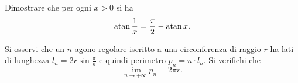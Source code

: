 \begin{exercise}
Dimostrare che per ogni $x>0$ si ha
\[
  \operatorname{atan} \frac 1 x = \frac \pi 2 - \operatorname{atan} x.
\]
\end{exercise}

\begin{exercise}
Si osservi che un $n$-agono regolare iscritto a una circonferenza 
di raggio $r$ ha lati di lunghezza $l_n = 2r\sin \frac{\pi}{n}$
e quindi perimetro $p_n = n\cdot l_n$.
Si verifichi che 
\[
  \lim_{n\to +\infty} p_n = 2\pi r.
\]
\end{exercise}
